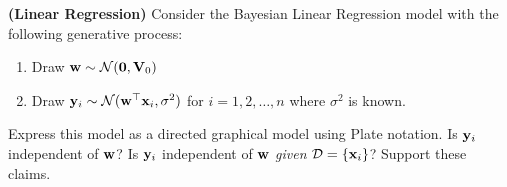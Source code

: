 \documentclass[12pt,letterpaper,fleqn]{hmcpset}
\begin{document}
\begin{problem}
\textbf{(Linear Regression)} Consider the Bayesian Linear Regression model with
the following generative process:
\begin{enumerate}[(1)]
    \item Draw ${\bf w} \sim {\cal N}({\bf 0}, \mathbf{V}_0)$
    \item Draw ${\bf y}_i \sim {\cal N}({\bf w}^\top{\bf x}_i, \sigma^2)$ for $i=1,2,\dots,n$ where $\sigma^2$
        is known.
\end{enumerate}
Express this model as a directed graphical model using Plate notation. Is ${\bf y}_i$
independent of ${\bf w}$? Is ${\bf y}_i$ independent of ${\bf w}$ \textit{given} ${\cal D} = \{{\bf x}_i\}$? Support
these claims.
\end{problem}
\begin{solution}
\vfill
\end{solution}
\newpage
\end{document}
